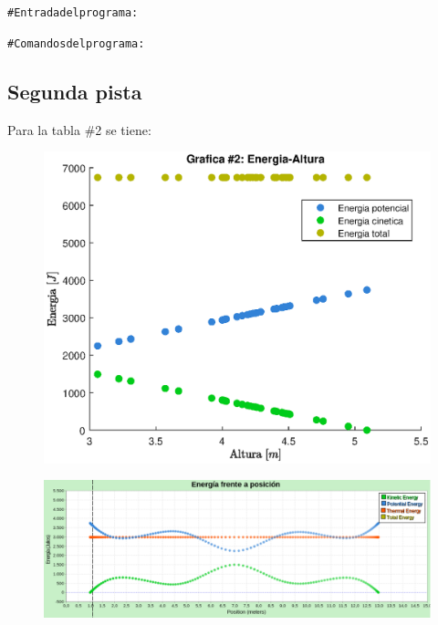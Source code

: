 \documentclass[letter,11pt]{article}
\begin{document}
\begin{shaded}
\begin{alltt}
\footnotesize
\# Entrada del programa:


\# Comandos del programa:


\normalsize
\end{alltt}
\end{shaded}

\subsection{Segunda pista}
Para la tabla \#2 se tiene:

\begin{figure}[!h]
\centering
\includegraphics[scale=1.00]{resources/8.2.1.eps}
\end{figure}

\begin{figure}[!h]
\centering
\includegraphics[scale=0.475]{resources/grafica2.eps}
\end{figure}
\end{document}
